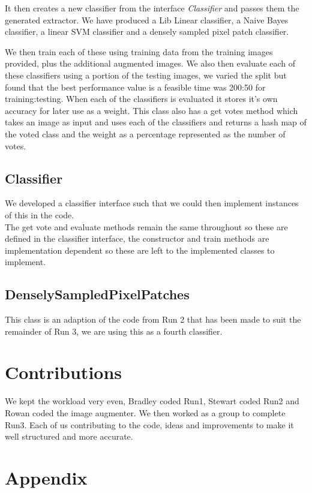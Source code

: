 \documentclass{article}
\begin{document}
	It then creates a new classifier from the interface \textit{Classifier} and passes them the generated extractor. We have produced a Lib Linear classifier, a Naive Bayes classifier, a linear SVM classifier and a densely sampled pixel patch classifier.
	\newline
	
	We then train each of these using training data from the training images provided, plus the additional augmented images. We also then evaluate each of these classifiers using a portion of the testing images, we varied the split but found that the best performance value is a feasible time was 200:50 for training:testing. When each of the classifiers is evaluated it stores it's own accuracy for later use as a weight. This class also has a get votes method which takes an image as input and uses each of the classifiers and returns a hash map of the voted class and the weight as a percentage represented as the number of votes.
	
	\subsection{Classifier}
	We developed a classifier interface such that we could then implement instances of this in the code.\\
	The get vote and evaluate methods remain the same throughout so these are defined in the classifier interface, the constructor and train methods are implementation dependent so these are left to the implemented classes to implement.
	
	\subsection{DenselySampledPixelPatches}
	This class is an adaption of the code from Run 2 that has been made to suit the remainder of Run 3, we are using this as a fourth classifier.
	
	\section{Contributions}
	We kept the workload very even, Bradley coded Run1, Stewart coded Run2 and Rowan coded the image augmenter. We then worked as a group to complete Run3. Each of us contributing to the code, ideas and improvements to make it well structured and more accurate.
	\newpage
	\centering
	\section*{Appendix}
	
	
\end{document}
